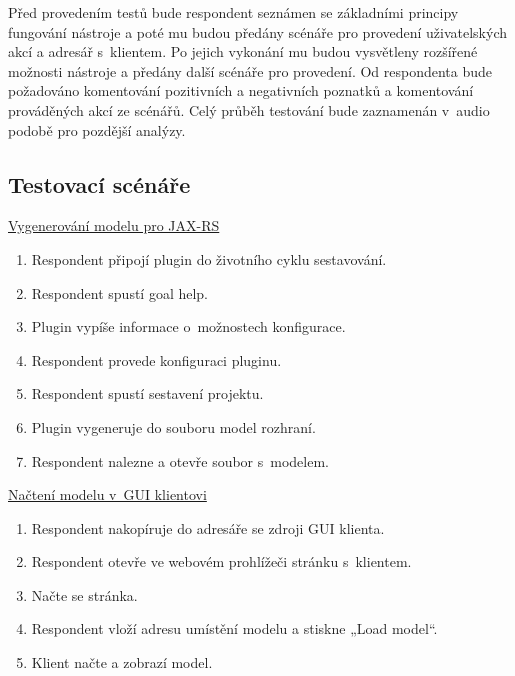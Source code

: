 \documentclass[11pt,twoside,a4paper]{book}
\begin{document}
Před provedením testů bude respondent seznámen se základními principy fungování
nástroje a poté mu budou předány scénáře pro provedení uživatelských akcí a
adresář s~klientem. Po jejich vykonání mu budou vysvětleny rozšířené možnosti
nástroje a předány další scénáře pro provedení. Od respondenta bude požadováno
komentování pozitivních a negativních poznatků a komentování prováděných akcí ze
scénářů. Celý průběh testování bude zaznamenán v~audio podobě pro pozdější
analýzy.

\subsection{Testovací scénáře}

\underline{Vygenerování modelu pro JAX-RS}

\begin{enumerate}
  \item Respondent připojí plugin do životního cyklu sestavování.
  
  \item Respondent spustí goal help.
  
  \item Plugin vypíše informace o~možnostech konfigurace.
  
  \item Respondent provede konfiguraci pluginu.
  
  \item Respondent spustí sestavení projektu.
  
  \item Plugin vygeneruje do souboru model rozhraní.
  
  \item Respondent nalezne a otevře soubor s~modelem.
\end{enumerate}

\underline{Načtení modelu v~GUI klientovi}

\begin{enumerate}
  \item Respondent nakopíruje do adresáře se zdroji GUI klienta.
  
  \item Respondent otevře ve webovém prohlížeči stránku s~klientem.
  
  \item Načte se stránka.
  
  \item Respondent vloží adresu umístění modelu a stiskne „Load model“.
  
  \item Klient načte a zobrazí model.
\end{enumerate}
  
\end{document}
